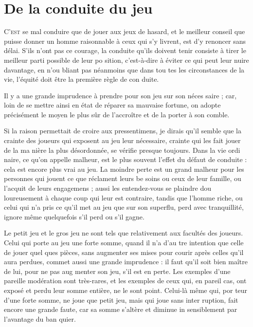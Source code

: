 \chapter
    [De la Conduite du Jeu]
    {De la conduite du jeu}

\lettrine{C}{'est} se mal conduire que de jouer
aux jeux de hasard, et le meilleur
conseil que puisse donner un homme
raisonnable à ceux qui s'y livrent,
est d'y renoncer sans délai. S'ils
n'ont pas ce courage, la conduite
qu'ils doivent tenir consiste à tirer
le meilleur parti possible de leur po%
sition, c'est-à-dire à éviter ce qui
peut leur nuire davantage, en n'ou%
bliant pas néanmoins que dans tou%
tes les circonstances de la vie, l'équité
doit être la première règle de con%
duite.

Il y a une grande imprudence à
prendre pour son jeu sur son néces%
saire ; car, loin de se mettre ainsi en
état de réparer sa mauvaise fortune,
on adopte précisément le moyen le
plus sûr de l'accroître et de la porter
à son comble.

Si la raison permettait de croire
aux pressentimens, je dirais qu'il
semble que la crainte des joueurs
qui exposent au jeu leur nécessaire,
crainte qui les fait jouer de la ma%
nière la plus désordonnée, se vérifie
presque toujours. Dans la vie ordi%
naire, ce qu'on appelle malheur, est
le plus souvent l'effet du défaut de
conduite : cela est encore plus vrai
au jeu. La moindre perte est un grand
malheur pour les personnes qui
jouent ce que réclament leurs be%
soins ou ceux de leur famille, ou
l'acquit de leurs engagemens ; aussi
les entendez-vous se plaindre dou%
loureusement à chaque coup qui leur
est contraire, tandis que l'homme
riche, ou celui qui n'a pris ce qu'il
met au jeu que sur son superflu,
perd avec tranquillité, ignore même
quelquefois s'il perd ou s'il gagne.

Le petit jeu et le gros jeu ne sont
tels que relativement aux facultés
des joueurs. Celui qui porte au jeu
une forte somme, quand il n'a d'au%
tre intention que celle de jouer quel%
ques pièces, sans augmenter ses
mises pour courir après celles qu'il
aura perdues, commet aussi une
grande imprudence : il faut qu'il soit
bien maître de lui, pour ne pas aug%
menter son jeu, s'il est en perte. Les
exemples d'une pareille modération
sont très-rares, et les exemples de
ceux qui, en pareil cas, ont exposé
et perdu leur somme entière, ne le
sont point. Celui-là même qui, por%
teur d'une forte somme, ne joue que
petit jeu, mais qui joue sans inter%
ruption, fait encore une grande faute,
car sa somme s'altère et diminue in%
sensiblement par l'avantage du ban%
quier.

